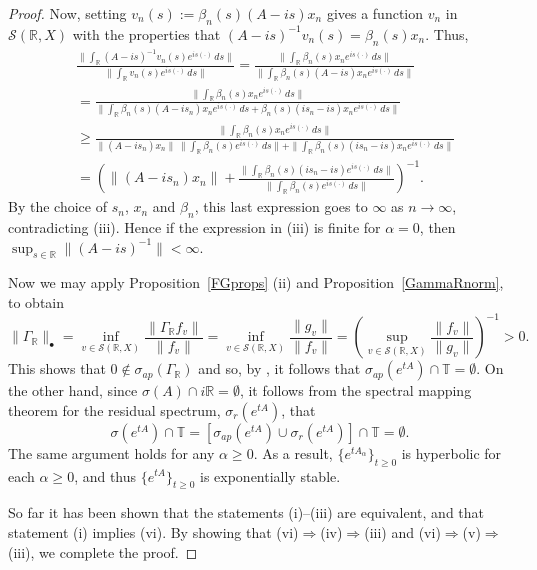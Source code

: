 \documentclass[10pt,psamsfonts,leqno]{siamltex}
\newcommand{\bbR}{\mathbb{R}}
\newcommand{\bbT}{\mathbb{T}}
\newcommand{\calS}{\mathcal{S}}
\begin{document}
\begin{proof}
Now, setting $v_n(s):=\beta_n(s)(A-is)x_n$ gives a function $v_n$ in
$\calS(\bbR,X)$ with the properties that
$(A-is)^{-1}v_n(s)=\beta_n(s)x_n$.
Thus,
\begin{align*}
&\frac{\|\int_\bbR(A-is)^{-1}v_n(s)e^{is(\cdot)}\,ds\|}
  {\|\int_\bbR v_n(s)e^{is(\cdot)}\,ds\|}
  =\frac{\|\int_\bbR
  \beta_n(s)x_ne^{is(\cdot)}\,ds\|}
  {\|\int_\bbR \beta_n(s)(A-is)x_n e^{is(\cdot)}\,ds\|}\\
&=\frac{\|\int_\bbR
  \beta_n(s)x_ne^{is(\cdot)}\,ds\|}
  {\|\int_\bbR \beta_n(s)(A-is_n)x_ne^{is(\cdot)}\,ds
    +\beta_n(s)(is_n-is)x_n e^{is(\cdot)}\,ds \|}\\
&\ge\frac{\|\int_\bbR
  \beta_n(s)x_ne^{is(\cdot)}\,ds\|}
  {\|(A-is_n)x_n\|\,\|\int_\bbR \beta_n(s)e^{is(\cdot)}\,ds\|
    +\|\int_\bbR\beta_n(s)(is_n-is)x_n e^{is(\cdot)}\,ds \|}\\
&=\left(\|(A-is_n)x_n\|+\frac{\|\int_\bbR
  \beta_n(s)(is_n-is)e^{is(\cdot)}\,ds\|}
  {\|\int_\bbR \beta_n(s)e^{is(\cdot)}\,ds\|}\right)^{-1}.
\end{align*}
By the choice of $s_n$, $x_n$
and $\beta_n$, this last expression goes to $\infty$ as $n\to\infty$,
contradicting (iii).  Hence if the expression in (iii) is finite for
$\alpha=0$, then
$\sup_{s\in\bbR}\|(A-is)^{-1}\|<\infty$.

Now we may apply
Proposition~\ref{FGprops} (ii) and Proposition~\ref{GammaRnorm}, to
obtain
$$
\| \Gamma_\bbR \| _\bullet
= \inf_{v\in \calS (\bbR,X)}\frac{\|\Gamma_\bbR f_v\|} {\|f_v \| }=
\inf_{v\in \calS(\bbR,X)}\frac{\|g_v \|}{\|f_v\|}
= \left(\sup_{v\in \calS(\bbR,X)}\frac{\|f_v \|}{\|g_v\|}\right) ^{-1}
>0.
$$
This shows that $0\notin \sigma_{ap}(\Gamma_\bbR)$ and so, by
\cite{LMS2}, it follows that $\sigma_{ap}(e^{tA})\cap \bbT = \emptyset$.
On the other hand, since $\sigma(A) \cap i\bbR =\emptyset$, it follows
from the spectral mapping theorem for the residual spectrum,
$\sigma_r(e^{tA})$, that
\begin{equation*}
\sigma(e^{tA})\cap \bbT= \left[ \sigma_{ap}(e^{tA}) \cup
\sigma_{r}(e^{tA}) \right] \cap \bbT = \emptyset.
\end{equation*}
The same argument holds for any $\alpha \ge 0$. As a result,
$\{e^{tA_\alpha} \}_{t\ge0}$ is hyperbolic for each $\alpha\ge 0$,
and thus
$\{e^{tA}\}_{t\ge0}$ is exponentially stable.

So far it has been shown that the statements (i)--(iii) are
equivalent, and that statement (i) implies (vi).  By showing that
(vi)$\Rightarrow$(iv)$\Rightarrow$(iii)
and (vi)$\Rightarrow$(v)$\Rightarrow$(iii), we complete the proof.


\end{proof}
\end{document}
